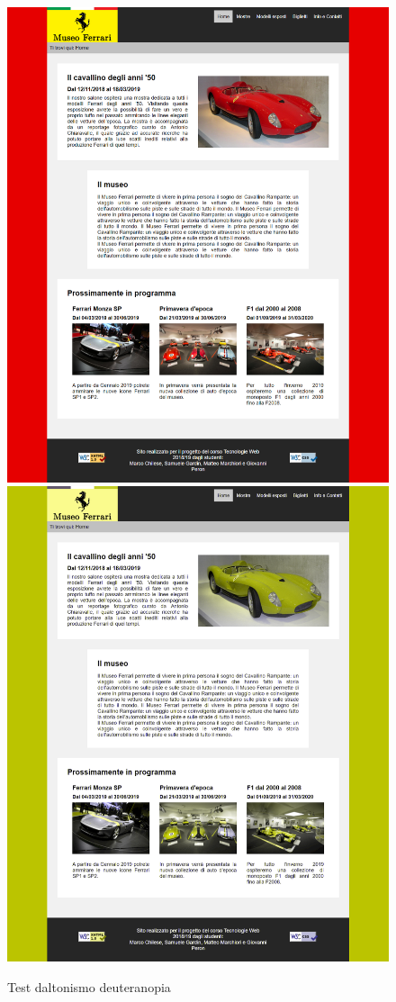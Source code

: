 \begin{figure}[!h]
	\begin{center}
		\includegraphics[scale=0.144]{Images/original.png}
		\includegraphics[scale=0.6]{Images/deuteranopia.png}
		\caption{Test daltonismo deuteranopia}
	\end{center}
\end{figure}
